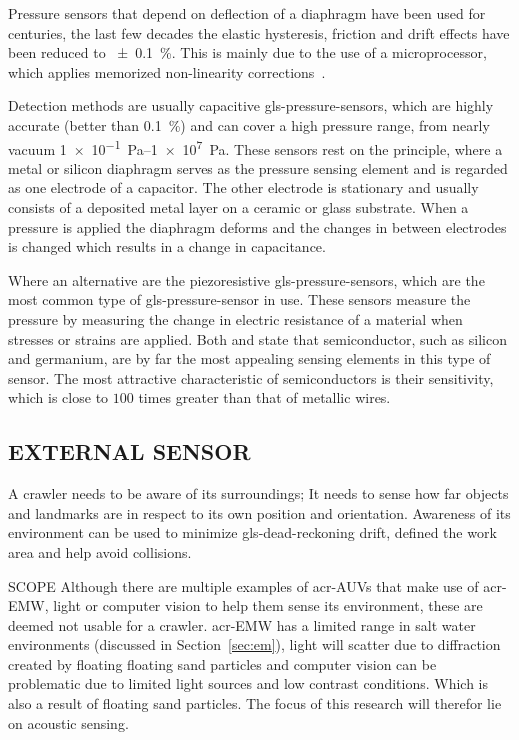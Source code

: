 Pressure sensors that depend on deflection of a diaphragm have been used for centuries, the last few decades the elastic
hysteresis, friction and drift effects have been reduced to \SI{\pm 0.1}{\percent}. This is mainly due to the use of a
microprocessor, which applies memorized non-linearity corrections~\cite{liptak_instrument_2003}.

Detection methods are usually capacitive \gls{gls-pressure-sensor}s, which are highly accurate (better than
\SI{0.1}{\percent}) and can cover a high pressure range, from nearly vacuum \SIrange{1e-1}{1e7}{\pascal}. These sensors
rest on the principle, where a metal or silicon diaphragm serves as the pressure sensing element and is regarded as one
electrode of a capacitor. The other electrode is stationary and usually consists of a deposited metal layer on a ceramic
or glass substrate. When a pressure is applied the diaphragm deforms and the changes in between electrodes is changed
which results in a change in capacitance.

Where an alternative are the piezoresistive \gls{gls-pressure-sensor}s, which are the most common type of
\gls{gls-pressure-sensor} in use. These sensors measure the pressure by measuring the change in electric resistance of a
material when stresses or strains are applied. Both \citet{webster_measurement_1999} and \citet{liptak_instrument_2003}
state that semiconductor, such as silicon and germanium, are by far the most appealing sensing elements in this type of
sensor. The most attractive characteristic of semiconductors is their sensitivity, which is close to \( 100 \) times
greater than that of metallic wires.

\subsection{EXTERNAL SENSOR}\label{sec:sensorenvironment}

A crawler needs to be aware of its surroundings; It needs to sense how far objects and landmarks are in respect to its
own position and orientation. Awareness of its environment can be used to minimize \gls{gls-dead-reckoning} drift,
defined the work area and help avoid collisions.

\begin{RoyalNote}{SCOPE}
    Although there are multiple examples of \gls{acr-AUV}s that make use of \gls{acr-EMW}, light or computer vision to
    help them sense its environment, these are deemed not usable for a crawler. \gls{acr-EMW} has a limited range in
    salt water environments (discussed in Section~\ref{sec:em}), light will scatter due to diffraction created by floating
    floating sand particles and computer vision can be problematic due to limited light sources and low contrast
    conditions. Which is also a result of floating sand particles. The focus of this research will therefor lie on
    acoustic sensing.
\end{RoyalNote}
